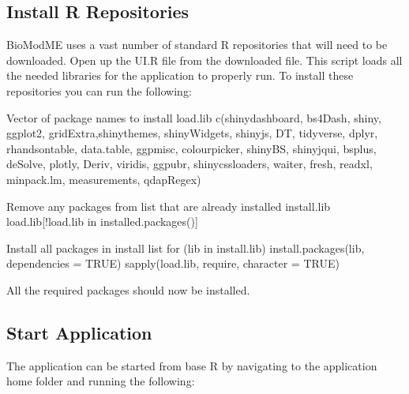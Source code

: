 \documentclass[letterpaper,10pt,english]{sphinxmanual}
\begin{document}
\subsection{Install R Repositories}
\label{\detokenize{pages/gettingStarted/downloadtoR:install-r-repositories}}
\sphinxAtStartPar
BioModME uses a vast number of standard R repositories that will need to be
downloaded. Open up the UI.R file from the downloaded file. This script
loads all the needed libraries for the application to properly run.  To install
these repositories you can run the following:

\begin{sphinxVerbatim}[commandchars=\\\{\}]
\PYGZsh{} Vector of package names to install
load.lib \PYGZlt{}\PYGZhy{} c(\PYGZdq{}shinydashboard\PYGZdq{}, \PYGZdq{}bs4Dash\PYGZdq{}, \PYGZdq{}shiny\PYGZdq{}, \PYGZdq{}ggplot2\PYGZdq{}, \PYGZdq{}gridExtra\PYGZdq{},\PYGZdq{}shinythemes\PYGZdq{},
            \PYGZdq{}shinyWidgets\PYGZdq{}, \PYGZdq{}shinyjs\PYGZdq{}, \PYGZdq{}DT\PYGZdq{}, \PYGZdq{}tidyverse\PYGZdq{}, \PYGZdq{}dplyr\PYGZdq{}, \PYGZdq{}rhandsontable\PYGZdq{}, \PYGZdq{}data.table\PYGZdq{},
            \PYGZdq{}ggpmisc\PYGZdq{}, \PYGZdq{}colourpicker\PYGZdq{}, \PYGZdq{}shinyBS\PYGZdq{}, \PYGZdq{}shinyjqui\PYGZdq{}, \PYGZdq{}bsplus\PYGZdq{}, \PYGZdq{}deSolve\PYGZdq{}, \PYGZdq{}plotly\PYGZdq{},
            \PYGZdq{}Deriv\PYGZdq{}, \PYGZdq{}viridis\PYGZdq{}, \PYGZdq{}ggpubr\PYGZdq{}, \PYGZdq{}shinycssloaders\PYGZdq{}, \PYGZdq{}waiter\PYGZdq{}, \PYGZdq{}fresh\PYGZdq{}, \PYGZdq{}readxl\PYGZdq{},
            \PYGZdq{}minpack.lm\PYGZdq{}, \PYGZdq{}measurements\PYGZdq{}, \PYGZdq{}qdapRegex\PYGZdq{})

\PYGZsh{} Remove any packages from list that are already installed
install.lib \PYGZlt{}\PYGZhy{} load.lib[!load.lib \PYGZpc{}in\PYGZpc{} installed.packages()]

\PYGZsh{} Install all packages in install list
for (lib in install.lib) install.packages(lib, dependencies = TRUE)
sapply(load.lib, require, character = TRUE)
\end{sphinxVerbatim}

\sphinxAtStartPar
All the required packages should now be installed.


\subsection{Start Application}
\label{\detokenize{pages/gettingStarted/downloadtoR:start-application}}
\sphinxAtStartPar
The application can be started from base R by navigating to the application
home folder and running the following:
\end{document}
